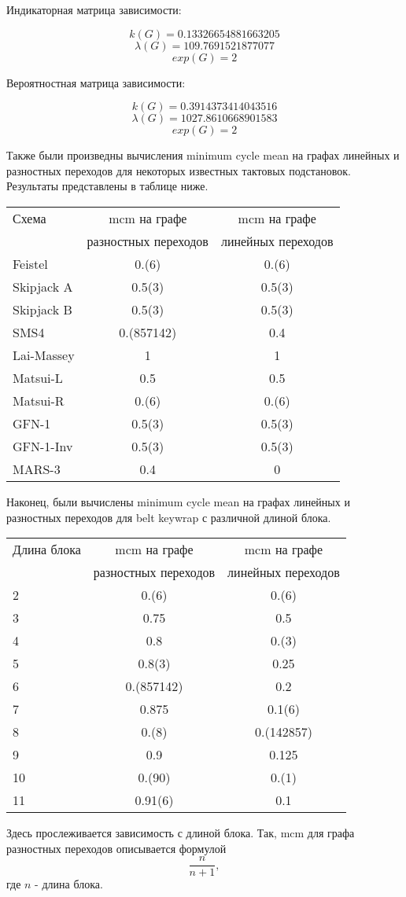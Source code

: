 \documentclass[a4paper,12pt]{report}
\theoremstyle{plain} %
\theoremstyle{definition}
\theoremstyle{remark}
\begin{document}
\begin{large}
Индикаторная матрица зависимости:

$$k(G) = 0.13326654881663205$$
$$\lambda(G) = 109.7691521877077$$
$$exp(G) = 2$$

Вероятностная матрица зависимости:

$$k(G) = 0.3914373414043516$$
$$\lambda(G) = 1027.8610668901583$$
$$exp(G) = 2$$

Также были произведны вычисления minimum cycle mean на графах линейных и разностных переходов для некоторых известных тактовых подстановок. Результаты представлены в таблице ниже.
\newline

\begin{tabular}{ l | c | c }
  \hline			
  Схема & mcm на графе & mcm на графе \\
   & разностных переходов & линейных переходов \\
\hline
  Feistel & 0.(6) & 0.(6) \\
  Skipjack A & 0.5(3) & 0.5(3) \\
  Skipjack B & 0.5(3) & 0.5(3) \\
  SMS4 & 0.(857142) & 0.4 \\
  Lai-Massey & 1& 1 \\
  Matsui-L & 0.5 & 0.5 \\
  Matsui-R & 0.(6) & 0.(6) \\
  GFN-1 & 0.5(3) & 0.5(3) \\
  GFN-1-Inv & 0.5(3) & 0.5(3)  \\
  MARS-3 & 0.4 & 0 \\
  \hline  
\end{tabular}

Наконец, были вычислены minimum cycle mean на графах линейных и разностных переходов для belt keywrap с различной длиной блока.
\newline
\newline
\begin{tabular}{ l | c | c }
  \hline			
  Длина блока & mcm на графе & mcm на графе \\
   & разностных переходов & линейных переходов \\
\hline
  2 & 0.(6) & 0.(6) \\
  3  & 0.75 & 0.5 \\
  4  & 0.8 & 0.(3) \\
  5 & 0.8(3) & 0.25 \\
  6 & 0.(857142) & 0.2 \\
  7 & 0.875 & 0.1(6) \\
  8 & 0.(8) & 0.(142857) \\
  9 & 0.9 & 0.125 \\
  10 & 0.(90) & 0.(1)  \\
  11 & 0.91(6) & 0.1 \\
  \hline  
\end{tabular}
\newline
\newline
\newline
Здесь прослеживается зависимость с длиной блока. Так, mcm для графа разностных переходов описывается формулой $$\frac{n}{n+1},$$ где $n$ - длина блока. 


\end{large}
\end{document}
